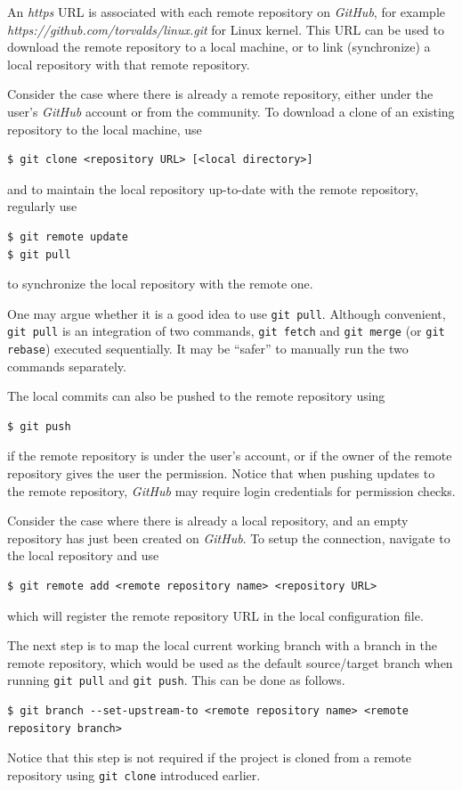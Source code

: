 An \textit{https} URL is associated with each remote repository on \textit{GitHub}, for example \textit{https://github.com/torvalds/linux.git} for Linux kernel. This URL can be used to download the remote repository to a local machine, or to link (synchronize) a local repository with that remote repository.

Consider the case where there is already a remote repository, either under the user's \textit{GitHub} account or from the community. To download a clone of an existing repository to the local machine, use
\begin{lstlisting}
$ git clone <repository URL> [<local directory>]
\end{lstlisting}
and to maintain the local repository up-to-date with the remote repository, regularly use
\begin{lstlisting}
$ git remote update
$ git pull
\end{lstlisting}
to synchronize the local repository with the remote one.

\begin{shortbox}

One may argue whether it is a good idea to use \verb|git pull|. Although convenient, \verb|git pull| is an integration of two commands, \verb|git fetch| and \verb|git merge| (or \verb|git rebase|) executed sequentially. It may be ``safer'' to manually run the two commands separately.
\end{shortbox}

The local commits can also be pushed to the remote repository using
\begin{lstlisting}
$ git push
\end{lstlisting}
if the remote repository is under the user's account, or if the owner of the remote repository gives the user the permission. Notice that when pushing updates to the remote repository, \textit{GitHub} may require login credentials for permission checks.

Consider the case where there is already a local repository, and an empty repository has just been created on \textit{GitHub}. To setup the connection, navigate to the local repository and use
\begin{lstlisting}
$ git remote add <remote repository name> <repository URL>
\end{lstlisting}
which will register the remote repository URL in the local configuration file.

The next step is to map the local current working branch with a branch in the remote repository, which would be used as the default source/target branch when running \verb|git pull| and \verb|git push|. This can be done as follows.
\begin{lstlisting}
$ git branch --set-upstream-to <remote repository name> <remote repository branch>
\end{lstlisting}
Notice that this step is not required if the project is cloned from a remote repository using \verb|git clone| introduced earlier.

